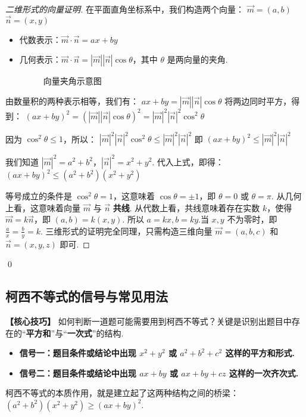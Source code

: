 \begin{proof}[二维形式的向量证明]
		在平面直角坐标系中，我们构造两个向量：
		$\vec{m} = (a, b)$
		$\vec{n} = (x, y)$
		\begin{itemize}
			\item 代数表示：$\vec{m} \cdot \vec{n} = ax+by$
			\item 几何表示：$\vec{m} \cdot \vec{n} = |\vec{m}||\vec{n}|\cos\theta$，其中 $\theta$ 是两向量的夹角.
			\begin{figure}[H]
				\centering
				\caption{向量夹角示意图}
			\end{figure}
		\end{itemize}
		
		由数量积的两种表示相等，我们有：
		$ax+by = |\vec{m}||\vec{n}|\cos\theta$
		将两边同时平方，得到：
		$(ax+by)^2 = (|\vec{m}||\vec{n}|\cos\theta)^2 = |\vec{m}|^2 |\vec{n}|^2 \cos^2\theta$

		因为 $\cos^2\theta \le 1$，所以：
		$|\vec{m}|^2 |\vec{n}|^2 \cos^2\theta \le |\vec{m}|^2 |\vec{n}|^2$
		即 $(ax+by)^2 \le |\vec{m}|^2 |\vec{n}|^2$

		我们知道 $|\vec{m}|^2 = a^2+b^2$，$|\vec{n}|^2 = x^2+y^2$.
		代入上式，即得：
		$(ax+by)^2 \le (a^2+b^2)(x^2+y^2)$
		
		等号成立的条件是 $\cos^2\theta = 1$，这意味着 $\cos\theta = \pm 1$，即 $\theta=0$ 或 $\theta=\pi$.
		从几何上看，这意味着向量 $\vec{m}$ 与 $\vec{n}$ \textbf{共线}.
		从代数上看，共线意味着存在实数 $k$，使得 $\vec{m} = k\vec{n}$，即 $(a,b)=k(x,y)$.
		所以 $a=kx, b=ky$.当 $x,y$ 不为零时，即 $\frac{a}{x}=\frac{b}{y}=k$.
	三维形式的证明完全同理，只需构造三维向量 $\vec{m}=(a,b,c)$ 和 $\vec{n}=(x,y,z)$ 即可.
\end{proof}
\qed

\subsection{柯西不等式的信号与常见用法}

\textbf{【核心技巧】}
\textcolor{green!50!black}{如何判断一道题可能需要用到柯西不等式？关键是识别出题目中存在的“\textbf{平方和}”与“\textbf{一次式}”的结构.}
\begin{itemize}
	\item \textbf{信号一：题目条件或结论中出现 $x^2+y^2$ 或 $a^2+b^2+c^2$ 这样的平方和形式.}
	\item \textbf{信号二：题目条件或结论中出现 $ax+by$ 或 $ax+by+cz$ 这样的一次齐次式.}
\end{itemize}
柯西不等式的本质作用，就是建立起了这两种结构之间的桥梁：$(a^2+b^2)(x^2+y^2) \ge (ax+by)^2$.

